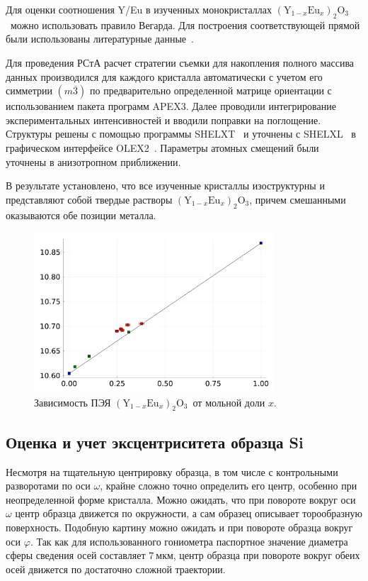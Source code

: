 \documentclass[a4paper,14pt]{extarticle}
\newcommand{\unit}[1]{ \ \text{#1}}
\newcommand{\YEu}{${(\text{Y}_{1-x}\text{Eu}_x)}_2\text{O}_3$}
\begin{document}
Для оценки соотношения Y/Eu в изученных монокристаллах \YEu~можно использовать правило Вегарда.
Для построения соответствующей прямой были использованы литературные данные~\cite{Swanson:1954,Morris:1984}.

Для проведения РСтА расчет стратегии съемки для накопления полного массива данных производился для каждого кристалла автоматически с учетом его симметрии $(m\overline{3})$ по предварительно определенной матрице ориентации с использованием пакета программ APEX3.
Далее проводили интегрирование экспериментальных интенсивностей и вводили поправки на поглощение.
Структуры решены с помощью программы SHELXT~\cite{Sheldrick:2015:shelxt} и уточнены с SHELXL~\cite{Sheldrick:2015:shelxl} в графическом интерфейсе OLEX2~\cite{Dolomanov:2009}.
Параметры атомных смещений были уточнены в анизотропном приближении.

В результате установлено, что все изученные кристаллы изоструктурны и представляют собой твердые растворы \YEu, причем смешанными оказываются обе позиции металла.
\begin{figure}[ht!]
    \centering
    \includegraphics[width=0.8\textwidth]{YEu.pdf}
    \caption{Зависимость ПЭЯ \YEu~от мольной доли $x$.}
    \label{fig:YEu}
\end{figure}

\subsection{Оценка и учет эксцентриситета образца Si}
Несмотря на тщательную центрировку образца, в том числе с контрольными разворотами по оси $\omega$, крайне сложно точно определить его центр, особенно при неопределенной форме кристалла.
Можно ожидать, что при повороте вокруг оси $\omega$ центр образца движется по окружности, а сам образец описывает торообразную поверхность.
Подобную картину можно ожидать и при повороте образца вокруг оси $\varphi$.
Так как для использованного гониометра паспортное значение диаметра сферы сведения осей составляет $7\unit{мкм}$, центр образца при повороте вокруг обеих осей движется по достаточно сложной траектории.
\end{document}
